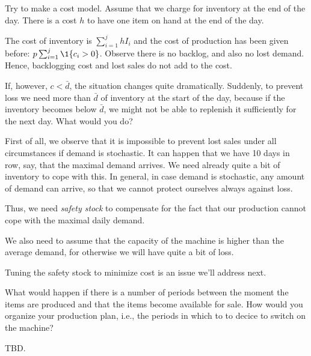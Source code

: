 \begin{question}
  Try to make a cost model. Assume that we charge for inventory at the
  end of the day.  There is a cost $h$ to have one item on hand at the
  end of the day.
  \begin{solution}
    The cost of inventory is $\sum_{i=1}^j h I_{i}$ and the cost of
    production has been given before: $p\sum_{i=1}^j \1{c_i>0}$.
    Observe there is no backlog, and also no lost demand. Hence,
    backlogging cost and lost sales do not add to the cost.
  \end{solution}
\end{question}

\begin{question}
  If, however, $c< \bar d$, the situation changes quite
  dramatically. Suddenly, to prevent loss we need more than $\bar d$
  of inventory at the start of the day, because if the inventory
  becomes below $\bar d$, we might not be able to replenish it
  sufficiently for the next day. What would you do?
  \begin{solution}
    First of all, we observe that it is impossible to prevent lost
    sales under all circumstances if demand is stochastic. It can
    happen that we have 10 days in row, say, that the maximal demand
    arrives. We need already quite a bit of inventory to cope with
    this. In general, in case demand is stochastic, any amount of
    demand can arrive, so that we cannot protect ourselves always
    against loss. 

    Thus, we need \emph{safety stock} to compensate for the fact that
    our production cannot cope with the maximal daily demand.

    We also need to assume that the capacity of the machine is higher
    than the average demand, for otherwise we will have quite a bit of
    loss. 

    Tuning the safety stock to minimize cost is an issue we'll address
    next. 


  \end{solution}
\end{question}

\begin{question}
  What would happen if there is a number of periods between the moment
  the items are produced and that the items become available for
  sale.  How would you organize your production plan, i.e., the periods in which to to decice to switch on the machine? 
  \begin{solution}
    TBD.
  \end{solution}
\end{question}

